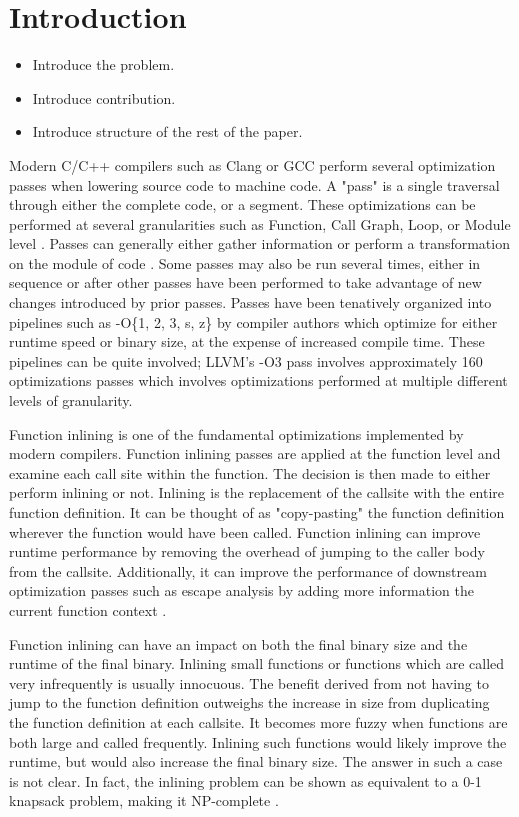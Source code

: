 \documentclass[nohyperref]{article}
\theoremstyle{plain}
\theoremstyle{definition}
\theoremstyle{remark}
\begin{document}
\section{Introduction}
\label{introduction}
\begin{itemize}
\item Introduce the problem\@.
\item Introduce contribution\@.
\item Introduce structure of the rest of the paper\@.
\end{itemize}

Modern C/C++ compilers such as Clang or GCC perform several optimization passes when lowering source code to machine code. A "pass" is a single traversal through either the complete code, or a segment. These optimizations can be performed at several granularities such as Function, Call Graph, Loop, or Module level \cite{lattner2008}. Passes can generally either gather information or perform a transformation on the module of code \cite{llvm-pass-docs}. Some passes may also be run several times, either in sequence or after other passes have been performed to take advantage of new changes introduced by prior passes. Passes have been tenatively organized into pipelines such as -O\{1, 2, 3, s, z\} by compiler authors which optimize for either runtime speed or binary size, at the expense of increased compile time. These pipelines can be quite involved; LLVM's -O3 pass involves approximately 160 optimizations passes which involves optimizations performed at multiple different levels of granularity.


Function inlining is one of the fundamental optimizations implemented by modern compilers. Function inlining passes are applied at the function level and examine each call site within the function. The decision is then made to either perform inlining or not. Inlining is the replacement of the callsite with the entire function definition. It can be thought of as "copy-pasting" the function definition wherever the function would have been called. Function inlining can improve runtime performance by removing the overhead of jumping to the caller body from the callsite. Additionally, it can improve the performance of downstream optimization passes such as escape analysis by adding more information the current function context \cite{Theodoridis_Grosser_Su_2022}.

Function inlining can have an impact on both the final binary size and the runtime of the final binary. Inlining small functions or functions which are called very infrequently is usually innocuous. The benefit derived from not having to jump to the function definition outweighs the increase in size from duplicating the function definition at each callsite. It becomes more fuzzy when functions are both large and called frequently. Inlining such functions would likely improve the runtime, but would also increase the final binary size. The answer in such a case is not clear. In fact, the inlining problem can be shown as equivalent to a 0-1 knapsack problem, making it NP-complete \cite{Theodoridis_Grosser_Su_2022}.
\end{document}
